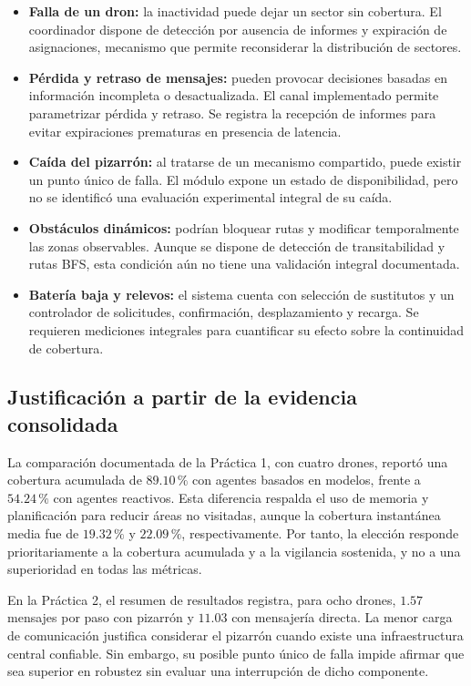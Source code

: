 \begin{itemize}
    \item \textbf{Falla de un dron:} la inactividad puede dejar un sector sin cobertura. El coordinador dispone de detección por ausencia de informes y expiración de asignaciones, mecanismo que permite reconsiderar la distribución de sectores.
    \item \textbf{Pérdida y retraso de mensajes:} pueden provocar decisiones basadas en información incompleta o desactualizada. El canal implementado permite parametrizar pérdida y retraso. Se registra la recepción de informes para evitar expiraciones prematuras en presencia de latencia.
    \item \textbf{Caída del pizarrón:} al tratarse de un mecanismo compartido, puede existir un punto único de falla. El módulo expone un estado de disponibilidad, pero no se identificó una evaluación experimental integral de su caída.
    \item \textbf{Obstáculos dinámicos:} podrían bloquear rutas y modificar temporalmente las zonas observables. Aunque se dispone de detección de transitabilidad y rutas BFS, esta condición aún no tiene una validación integral documentada.
    \item \textbf{Batería baja y relevos:} el sistema cuenta con selección de sustitutos y un controlador de solicitudes, confirmación, desplazamiento y recarga. Se requieren mediciones integrales para cuantificar su efecto sobre la continuidad de cobertura.
\end{itemize}

\subsection{Justificación a partir de la evidencia consolidada}

La comparación documentada de la Práctica 1, con cuatro drones, reportó una cobertura acumulada de $89.10\,\%$ con agentes basados en modelos, frente a $54.24\,\%$ con agentes reactivos. Esta diferencia respalda el uso de memoria y planificación para reducir áreas no visitadas, aunque la cobertura instantánea media fue de $19.32\,\%$ y $22.09\,\%$, respectivamente. Por tanto, la elección responde prioritariamente a la cobertura acumulada y a la vigilancia sostenida, y no a una superioridad en todas las métricas.

En la Práctica 2, el resumen de resultados registra, para ocho drones, $1.57$ mensajes por paso con pizarrón y $11.03$ con mensajería directa. La menor carga de comunicación justifica considerar el pizarrón cuando existe una infraestructura central confiable. Sin embargo, su posible punto único de falla impide afirmar que sea superior en robustez sin evaluar una interrupción de dicho componente.

